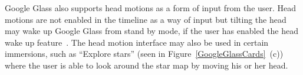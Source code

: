 Google Glass also supports head motions as a form of input from the user. Head motions are not enabled in the timeline as a way of input but tilting the head may wake up Google Glass from stand by mode, if the user has enabled the head wake up feature~\cite{headWakeUp}. The head motion interface may also be used in certain immersions, such as ``Explore stars'' (seen in Figure~\ref{GoogleGlassCards}~(c)) where the user is able to look around the star map by moving his or her head.




